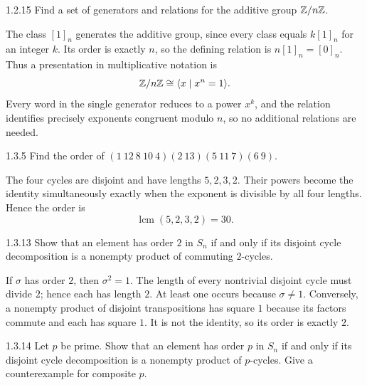 \documentclass[11pt,oneside]{article}
\begin{document}
\begin{exercise}{1.2.15}
Find a set of generators and relations for the additive group $\mathbb{Z}/n\mathbb{Z}$.
\end{exercise}

\begin{solution}
The class $[1]_n$ generates the additive group, since every class equals $k[1]_n$ for an integer $k$. Its order is exactly $n$, so the defining relation is $n[1]_n=[0]_n$. Thus a presentation in multiplicative notation is
\[
 \mathbb{Z}/n\mathbb{Z}\cong\langle x\mid x^n=1\rangle.
\]
Every word in the single generator reduces to a power $x^k$, and the relation identifies precisely exponents congruent modulo $n$, so no additional relations are needed.
\end{solution}

\begin{exercise}{1.3.5}
Find the order of $(1\ 12\ 8\ 10\ 4)(2\ 13)(5\ 11\ 7)(6\ 9)$.
\end{exercise}

\begin{solution}
The four cycles are disjoint and have lengths $5,2,3,2$. Their powers become the identity simultaneously exactly when the exponent is divisible by all four lengths. Hence the order is
\[
 \operatorname{lcm}(5,2,3,2)=\boxed{30}.
\]
\end{solution}

\begin{exercise}{1.3.13}
Show that an element has order $2$ in $S_n$ if and only if its disjoint cycle decomposition is a nonempty product of commuting $2$-cycles.
\end{exercise}

\begin{solution}
If $\sigma$ has order $2$, then $\sigma^2=1$. The length of every nontrivial disjoint cycle must divide $2$; hence each has length $2$. At least one occurs because $\sigma\ne1$. Conversely, a nonempty product of disjoint transpositions has square $1$ because its factors commute and each has square $1$. It is not the identity, so its order is exactly $2$.
\end{solution}

\begin{exercise}{1.3.14}
Let $p$ be prime. Show that an element has order $p$ in $S_n$ if and only if its disjoint cycle decomposition is a nonempty product of $p$-cycles. Give a counterexample for composite $p$.
\end{exercise}
\end{document}
